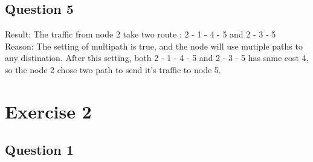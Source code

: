 \documentclass{article}
\begin{document}
\subsection{Question 5}

Result: The traffic from node 2 take two route : 2 - 1 - 4 - 5 and 2 - 3 - 5 \\
Reason: The setting of multipath is true, and the node will use mutiple paths to any distination. After this setting, both 2 - 1 - 4 - 5 and 2 - 3 - 5 has same cost 4, so the node 2 chose two path to send it's traffic to node 5.

\section{Exercise 2}

\subsection{Question 1}
\end{document}

